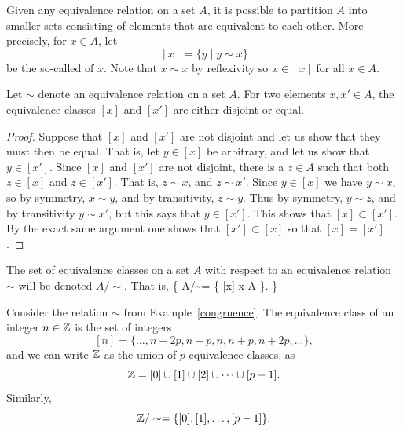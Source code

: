 Given any equivalence relation on a set $A$, it is possible to partition $A$ into smaller sets consisting of elements that are equivalent to each other. More precisely, for $x \in A$, let
\[
  [x] = \{ y \mid y \sim x \}
\]
be the so-called  of $x$. Note that $x \sim x$ by reflexivity so $x \in [x]$ for all $x \in A$.
\begin{lem}
  Let $\sim$ denote an equivalence relation on a set $A$. For two elements $x, x' \in A$, the equivalence classes $[x]$ and $[x']$ are either disjoint or equal.
\end{lem}
\begin{proof}
  Suppose that $[x]$ and $[x']$ are not disjoint and let us show that they must then be equal. That is, let $y \in [x]$ be arbitrary, and let us show that $y \in [x']$. Since $[x]$ and $[x']$ are not disjoint, there is a $z \in A$ such that both $z \in [x]$ and $z \in [x']$. That is, $z \sim x$, and $z \sim x'$. Since $y \in [x]$ we have $y \sim x$, so by symmetry, $x \sim y$, and by transitivity, $z \sim y$. Thus by symmetry, $y \sim z$, and by transitivity $y \sim x'$, but this says that $y \in [x']$. This shows that $[x] \subset [x']$. By the exact same argument one shows that $[x'] \subset [x]$ so that $[x] = [x']$.
\end{proof}
The set of equivalence classes on a set $A$ with respect to an equivalence relation $\sim$ will be denoted $A/\sim$. That is,
\{
  A/\sim = \{ [x] \mid x \in A \}.
\}
\begin{example}
  Consider the relation $\sim$ from Example~\ref{congruence}. The equivalence class of an integer $n \in \mathbb{Z}$ is the set of integers
  \[
    [n] = \{\dots, n-2p, n-p, n, n+p, n+2p, \dots \},
  \]
  and we can write $\mathbb{Z}$ as the union of $p$ equivalence classes, as
  \[
    \mathbb{Z} = [0] \cup [1] \cup [2] \cup \dots \cup [p-1].
  \]
  Similarly,
  \[
    \mathbb{Z}/\sim = \{[0], [1], \dots, [p-1]\}.
  \]
\end{example}
